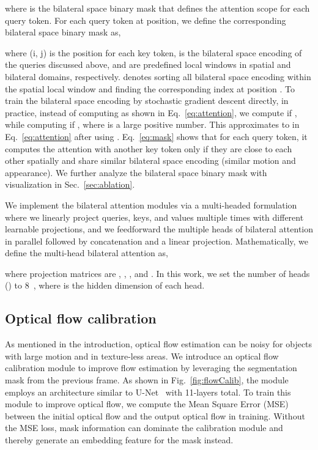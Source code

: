 \documentclass[runningheads]{llncs}
\begin{document}
{\parindent0pt where}  is the bilateral space binary mask that defines the attention scope for each query token. For each query token  at  position, we define the corresponding bilateral space binary mask  as, 



{\parindent0pt where} (i, j) is the position for each key token,  is the bilateral space encoding of the queries discussed above,  and  are predefined local windows in spatial and bilateral domains, respectively.  denotes sorting all bilateral space encoding  within the spatial local window  and finding the corresponding index at position . To train the bilateral space encoding  by stochastic gradient descent directly, in practice, instead of computing  as shown in Eq.~\ref{eq:attention}, we compute  if , while computing  if , where  is a large positive number. This approximates to  in Eq.~\ref{eq:attention} after using . Eq.~\ref{eq:mask} shows that for each query token, it computes the attention with another key token only if they are close to each other spatially and share similar bilateral space encoding (similar motion and appearance). We further analyze the bilateral space binary mask with visualization in Sec.~\ref{sec:ablation}.

We implement the bilateral attention modules via a multi-headed formulation~\cite{vaswani2017attention} where we linearly project queries, keys, and values multiple times with different learnable projections, and we feedforward the multiple heads of bilateral attention in parallel followed by concatenation and a linear projection. Mathematically, we define the multi-head bilateral attention as,



{\parindent0pt where} projection matrices are , , , and . In this work, we set the number of heads () to 8~\cite{vaswani2017attention}, where  is the hidden dimension of each head.




\subsection{Optical flow calibration}\label{sec:calib}
As mentioned in the introduction, optical flow estimation can be noisy for objects with large motion and in texture-less areas. We introduce an optical flow calibration module to improve flow estimation by leveraging the segmentation mask from the previous frame. As shown in Fig.~\ref{fig:flowCalib}, the module employs an architecture similar to U-Net~\cite{ronneberger2015u} with 11-layers total.  
To train this module to improve optical flow, we compute the Mean Square Error (MSE)
between the initial optical flow and the output optical flow in training.
Without the MSE loss,
mask information can dominate the calibration module and thereby generate an embedding feature for the mask instead. 
\end{document}
